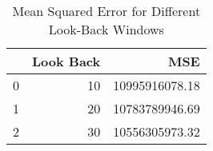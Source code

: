 \begin{table}
    \caption{Mean Squared Error for Different Look-Back Windows}
    \label{tab:mse_results}
    \begin{tabular}{lrr}
        \toprule
        & Look Back & MSE \\
        \midrule
        0 & 10 & 10995916078.18 \\
        1 & 20 & 10783789946.69 \\
        2 & 30 & 10556305973.32 \\
        \bottomrule
    \end{tabular}
\end{table}
